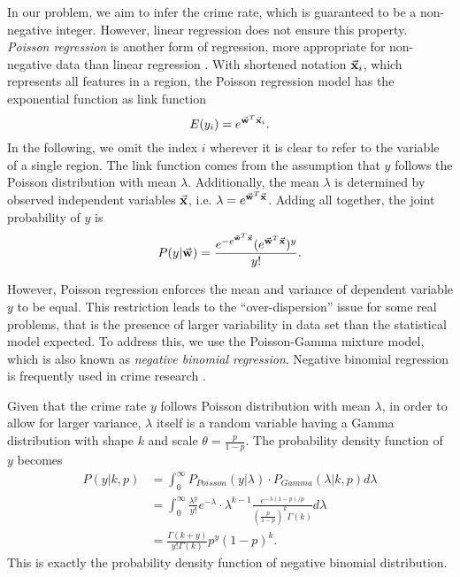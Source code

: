 In our problem, we aim to infer the crime rate, which is guaranteed to be a non-negative integer. However, linear regression does not ensure this property. 
\emph{Poisson regression} is another form of regression, more appropriate for non-negative data than linear regression \cite{GMS95, Lamb92}. With shortened notation $\vec{\mathbf{x}}_i$, which represents all features in a region, the Poisson regression model has the exponential function as link function
\begin{equation}
\label{eq:prm}
E(y_i) = e^{\vec{\mathbf{w}}^T \vec{\mathbf{x}}_i}.
\end{equation}
In the following, we omit the index $i$ wherever it is clear to refer to the variable of a single region.
The link function comes from the assumption that $y$ follows the Poisson distribution with mean $\lambda $. Additionally, the mean $\lambda$ is determined by observed independent variables $\vec{\mathbf{x}}$, i.e. $\lambda = e^{\vec{\mathbf{w}}^T \vec{\mathbf{x}}}$. Adding all together, the joint probability of $y$ is 
\begin{equation}
P(y|\vec{\mathbf{w}}) = \frac{e^{-e^{\vec{\mathbf{w}}^T\vec{\mathbf{x}}}}(e^{\vec{\mathbf{w}}^T\vec{\mathbf{x}}})^y}{y!}.
\end{equation}


However, Poisson regression enforces the mean and variance of dependent variable $y$ to be equal. This restriction leads to the ``over-dispersion'' issue for some real problems, that is the presence of larger variability in data set than the statistical model expected. To address this,  we use the Poisson-Gamma mixture model, which is also known as \emph{negative binomial regression}. Negative binomial regression is frequently used in crime research \cite{Osg00}.

Given that the crime rate $y$ follows Poisson distribution with mean $\lambda$, in order to allow for larger variance, $\lambda$ itself is a random variable having a Gamma distribution with shape $k$ and scale $\theta = \frac{p}{1-p}$.  The probability density function of $y$ becomes
\begin{align}
\label{eq:nbpdf}
P(y|k, p) & = \int_0^{\infty} P_{Poisson}(y|\lambda) \cdot P_{Gamma}(\lambda|k, p) d \lambda \nonumber \\
		& = \int_0^{\infty} \frac{\lambda^y}{y!} e^{-\lambda} \cdot \lambda^{k-1} \frac{e^{-\lambda(1-p)/p}}{(\frac{p}{1-p})^k \Gamma(k)} d\lambda  \nonumber \\
		 & = \frac{\Gamma(k+y)}{y! \Gamma(k)} p^y (1-p)^k.
\end{align}
This is exactly the probability density function of negative binomial distribution.


